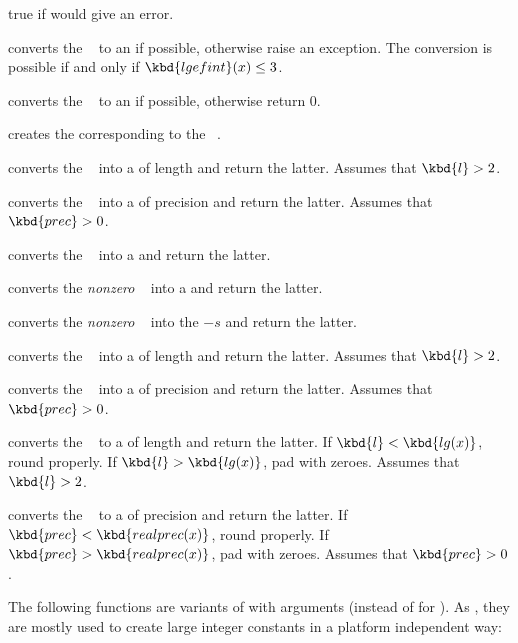  true if  would give an error.

 converts the ~ to an  if
possible, otherwise raise an exception. The conversion is possible if
and only if $\kbd{lgefint}(x) \leq 3$.

 converts the ~ to an
 if possible, otherwise return $0$.

 creates the  corresponding to the
~.

 converts the ~ into a
 of length  and return the latter. Assumes that
$\kbd{l} > 2$.

 converts the ~ into a
 of precision  and return the latter. Assumes that
$\kbd{prec} > 0$.

 converts the ~ into a 
and return the latter.

 converts the \emph{nonzero} ~
into a  and return the latter.

 converts the \emph{nonzero} ~
into the  $-s$ and return the latter.

 converts the ~ into a
 of length  and return the latter. Assumes that
$\kbd{l} > 2$.

 converts the ~ into a
 of precision  and return the latter. Assumes that
$\kbd{prec} > 0$.

 converts the ~ to a
 of length  and return the latter. If
$\kbd{l} < \kbd{lg(x)}$, round properly. If $\kbd{l} > \kbd{lg(x)}$,
pad with zeroes. Assumes that $\kbd{l} > 2$.

 converts the ~ to a
 of precision  and return the latter. If
$\kbd{prec} < \kbd{realprec(x)}$, round properly. If $\kbd{prec} >
\kbd{realprec(x)}$, pad with zeroes. Assumes that $\kbd{prec} > 0$.

\noindent The following functions are variants of  with
 arguments (instead of  for
). As , they are mostly used to create large
integer constants in a platform independent way:

